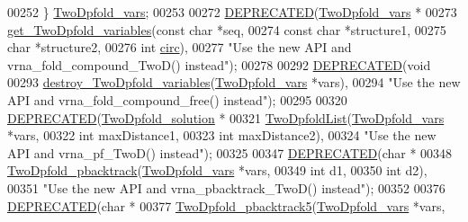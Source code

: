 \begin{DoxyCode}
00252 \} \mbox{\hyperlink{struct_two_dpfold__vars}{TwoDpfold\_vars}};
00253 
00272 \mbox{\hyperlink{2_dpfold_8h_aab347a3c03fbe8e7319551b9fa0cce4a}{DEPRECATED}}(\mbox{\hyperlink{struct_two_dpfold__vars}{TwoDpfold\_vars}} *
00273            \mbox{\hyperlink{2_dpfold_8h_a1aca740e2a75ab2b2951538266e53d64}{get\_TwoDpfold\_variables}}(\textcolor{keyword}{const} \textcolor{keywordtype}{char} *seq,
00274                                    \textcolor{keyword}{const} \textcolor{keywordtype}{char} *structure1,
00275                                    \textcolor{keywordtype}{char}       *structure2,
00276                                    \textcolor{keywordtype}{int}        \mbox{\hyperlink{group__model__details_gaf9202a1a09f5828dc731e2d9a10fa111}{circ}}),
00277           \textcolor{stringliteral}{"Use the new API and vrna\_fold\_compound\_TwoD() instead"});
00278 
00292 \mbox{\hyperlink{2_dpfold_8h_aab347a3c03fbe8e7319551b9fa0cce4a}{DEPRECATED}}(\textcolor{keywordtype}{void}
00293            \mbox{\hyperlink{2_dpfold_8h_afe994291458ee2ac34d3eb825ef62a15}{destroy\_TwoDpfold\_variables}}(\mbox{\hyperlink{struct_two_dpfold__vars}{TwoDpfold\_vars}} *vars),
00294            \textcolor{stringliteral}{"Use the new API and vrna\_fold\_compound\_free() instead"});
00295 
00320 \mbox{\hyperlink{2_dpfold_8h_aab347a3c03fbe8e7319551b9fa0cce4a}{DEPRECATED}}(\mbox{\hyperlink{2_dpfold_8h_ab8a8411ac20b57a2f569edd6da7fcbc2}{TwoDpfold\_solution}} *
00321            \mbox{\hyperlink{2_dpfold_8h_a692243dac482a1e158a8e1b7881cfda2}{TwoDpfoldList}}(\mbox{\hyperlink{struct_two_dpfold__vars}{TwoDpfold\_vars}} *vars,
00322                          \textcolor{keywordtype}{int}            maxDistance1,
00323                          \textcolor{keywordtype}{int}            maxDistance2),
00324           \textcolor{stringliteral}{"Use the new API and vrna\_pf\_TwoD() instead"});
00325 
00347 \mbox{\hyperlink{2_dpfold_8h_aab347a3c03fbe8e7319551b9fa0cce4a}{DEPRECATED}}(\textcolor{keywordtype}{char} *
00348            \mbox{\hyperlink{2_dpfold_8h_ae251288f50dd4ae7d315af0085775f71}{TwoDpfold\_pbacktrack}}(\mbox{\hyperlink{struct_two_dpfold__vars}{TwoDpfold\_vars}}  *vars,
00349                                 \textcolor{keywordtype}{int}             d1,
00350                                 \textcolor{keywordtype}{int}             d2),
00351           \textcolor{stringliteral}{"Use the new API and vrna\_pbacktrack\_TwoD() instead"});
00352 
00376 \mbox{\hyperlink{2_dpfold_8h_aab347a3c03fbe8e7319551b9fa0cce4a}{DEPRECATED}}(\textcolor{keywordtype}{char} *
00377            \mbox{\hyperlink{2_dpfold_8h_a13430ac6a7f90df426774f131647d2c7}{TwoDpfold\_pbacktrack5}}(\mbox{\hyperlink{struct_two_dpfold__vars}{TwoDpfold\_vars}} *vars,

\end{DoxyCode}

